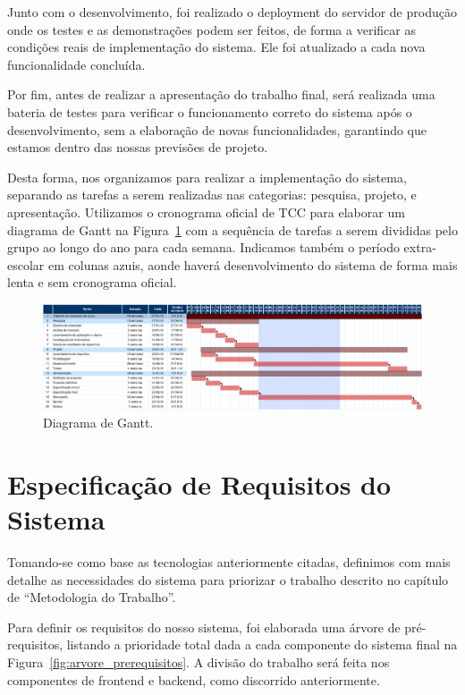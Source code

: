 \documentclass[]{politex}
\begin{document}
Junto com o desenvolvimento, foi realizado o deployment do servidor de produção
onde os testes e as demonstrações podem ser feitos, de forma a verificar as
condições reais de implementação do sistema. Ele foi atualizado a cada nova
funcionalidade concluída.

Por fim, antes de realizar a apresentação do trabalho final, será realizada uma
bateria de testes para verificar o funcionamento correto do sistema após o
desenvolvimento, sem a elaboração de novas funcionalidades, garantindo que
estamos dentro das nossas previsões de projeto.

Desta forma, nos organizamos para realizar a implementação do sistema, separando
as tarefas a serem realizadas nas categorias: pesquisa, projeto, e apresentação.
Utilizamos o cronograma oficial de TCC para elaborar um diagrama de Gantt na
Figura~\ref{fig:gantt} com a sequência de tarefas a serem divididas pelo grupo
ao longo do ano para cada semana. Indicamos também o período extra-escolar em
colunas azuis, aonde haverá desenvolvimento do sistema de forma mais lenta e
sem cronograma oficial.

\begin{figure}[H]
    \centering
    \includegraphics[width=6.5in]{imagens/diagrama_gantt}
    \caption{Diagrama de Gantt.}
    \label{fig:gantt}
\end{figure}

\chapter{Especificação de Requisitos do Sistema}

Tomando-se como base as tecnologias anteriormente citadas, definimos com mais
detalhe as necessidades do sistema para priorizar o trabalho descrito no
capítulo de ``Metodologia do Trabalho''.

Para definir os requisitos do nosso sistema, foi elaborada uma árvore de
pré-requisitos, listando a prioridade total dada a cada componente do sistema
final na Figura~\ref{fig:arvore_prerequisitos}. A divisão do trabalho será
feita nos componentes de frontend e backend, como discorrido anteriormente.
\end{document}
